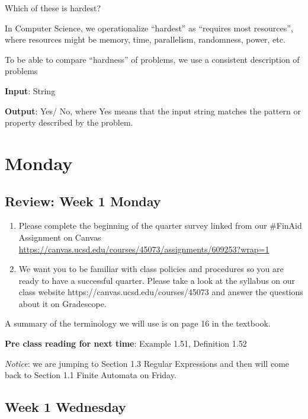 Which of these is hardest?

\vfill

In Computer Science, we operationalize ``hardest'' as ``requires most resources'', where
resources might be memory, time, parallelism, randomness, power, etc.

To be able to compare ``hardness'' of problems, we use a consistent description of problems

{\bf Input}: String

{\bf Output}: Yes/ No, where Yes means that the input string matches the pattern or property described by the problem.


\newpage
\section*{Monday}


    
\newpage
\subsection*{Review: Week 1 Monday}
\begin{enumerate}
\item Please complete the beginning of the quarter survey linked from our \#FinAid
Assignment on Canvas \href{https://canvas.ucsd.edu/courses/45073/assignments/609253}{https://canvas.ucsd.edu/courses/45073/assignments/609253?wrap=1}
\item We want you to be familiar with class policies and procedures so you are ready to have a successful quarter. 
Please take a look at the syllabus on our class website https://canvas.ucsd.edu/courses/45073
and answer the questions about it on Gradescope.
\end{enumerate}

A summary of the terminology we will use is on page 16 in the textbook.

{\bf Pre class reading for next time}: Example 1.51, Definition 1.52

{\it Notice}: we are jumping to Section 1.3 Regular Expressions and then will come back 
to Section 1.1 Finite Automata on Friday.


\newpage
\subsection*{Week 1 Wednesday}



